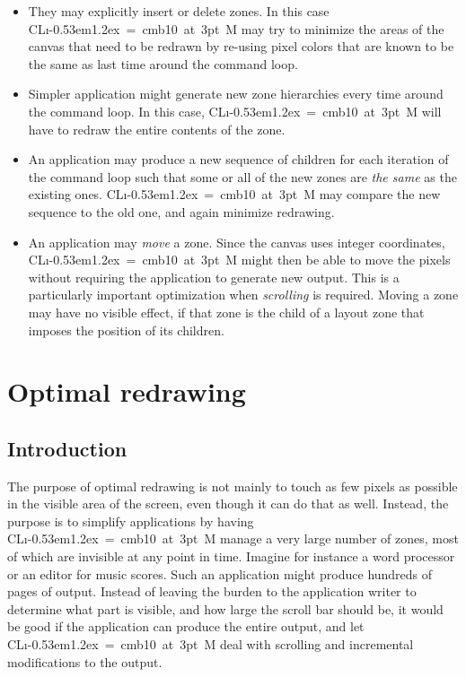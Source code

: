 \documentclass{report}
\def\Tiny{ \font\Tinyfont = cmb10 at 3pt \relax  \Tinyfont}
\def\clim{\textsf{CL{\i}\kern-0.53em\raise1.2ex\hbox{\Tiny 3}M}}
\begin{document}
\begin{itemize}
\item They may explicitly insert or delete zones.  In this case
  \clim{} may try to minimize the areas of the canvas that need to be
  redrawn by re-using pixel colors that are known to be the same as
  last time around the command loop.

\item Simpler application might generate new zone hierarchies every
  time around the command loop.  In this case, \clim{} will have to
  redraw the entire contents of the zone.

\item An application may produce a new sequence of children for each
  iteration of the command loop such that some or all of the new zones
  are \emph{the same} as the existing ones.  \clim{} may compare the
  new sequence to the old one, and again minimize redrawing.

\item An application may \emph{move} a zone.  Since the canvas uses
  integer coordinates, \clim{} might then be able to move the pixels
  without requiring the application to generate new output.  This is a
  particularly important optimization when \emph{scrolling} is
  required.  Moving a zone may have no visible effect, if that zone is
  the child of a layout zone that imposes the position of its
  children.
\end{itemize}

\chapter{Optimal redrawing}

\section{Introduction}

The purpose of optimal redrawing is not mainly to touch as few pixels
as possible in the visible area of the screen, even though it can do
that as well.  Instead, the purpose is to simplify applications by
having \clim{} manage a very large number of zones, most of which
are invisible at any point in time.  Imagine for instance a word
processor or an editor for music scores.  Such an application might
produce hundreds of pages of output.  Instead of leaving the burden to
the application writer to determine what part is visible, and how
large the scroll bar should be, it would be good if the application
can produce the entire output, and let \clim{} deal with scrolling and
incremental modifications to the output.  
\end{document}
